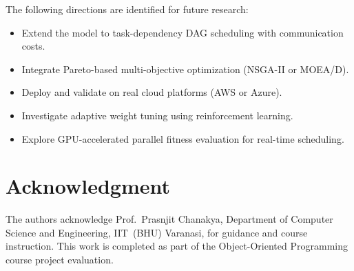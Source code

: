 \documentclass[conference]{IEEEtran}
\begin{document}
The following directions are identified for future research:
\begin{itemize}
    \item Extend the model to task-dependency DAG scheduling with communication costs.
    \item Integrate Pareto-based multi-objective optimization (NSGA-II or MOEA/D).
    \item Deploy and validate on real cloud platforms (AWS or Azure).
    \item Investigate adaptive weight tuning using reinforcement learning.
    \item Explore GPU-accelerated parallel fitness evaluation for real-time scheduling.
\end{itemize}


\section*{Acknowledgment}
The authors acknowledge Prof.\ Prasnjit Chanakya, Department of Computer Science and Engineering, IIT~(BHU) Varanasi, for guidance and course instruction. This work is completed as part of the Object-Oriented Programming course project evaluation.
\end{document}
